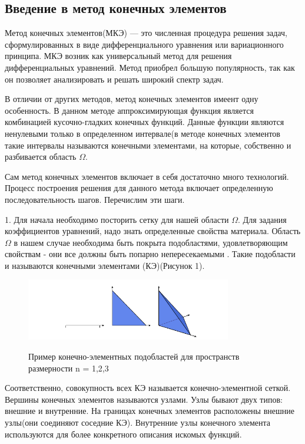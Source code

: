 \subsection{Введение в метод конечных элементов}

Метод конечных элементов(МКЭ) — это численная процедура решения задач,
сформулированных в виде дифференциального уравнения или вариационного 
принципа.\cite{bib:leibezon}
МКЭ возник как универсальный метод для решения дифференциальных уравнений. 
Метод приобрел большую популярность, так как он позволяет анализировать и
решать широкий спектр задач.


В отличии от других методов, метод конечных элементов имеент одну особенность.
В данном методе аппроксимирующая функция является комбинацией кусочно-гладких конечных функций.
Данные функции являются ненулевыми только в определенном интервале(в методе конечных элементов такие интервалы
называются конечными элементами, на которые, собственно и разбивается область $\Omega$.

Сам метод конечных элементов включает в себя достаточно много технологий. 
Процесс построения решения для данного метода включает
определенную последовательность шагов. Перечислим эти шаги.

1. Для начала необходимо посторить сетку для нашей области $\Omega$.
Для задания коэффициентов уравнений, надо знать определенные свойства материала.
Область $\Omega$ в нашем случае необходима быть покрыта подобластями, удовлетворяющим свойствам - 
они все должны быть попарно непересекаемыми \cite{bib:thomas}. Такие подобласти и называются конечными элементами (КЭ)(Рисунок 1).

\renewcommand{\figurename}{Рисунок}
\begin{figure}[H]
      \centering
      \includegraphics[width=0.8\textwidth]{./pics/random-cells.png}\\
      \centering\caption{Пример конечно-элементных подобластей для пространств размерности n = 1,2,3}
\end{figure}
Соответственно, совокупность всех КЭ называется конечно-элементной сеткой\cite{bib:logg}.
Вершины конечных элементов называются узлами. Узлы бывают двух типов: внешние и внутренние.
На границах конечных элементов расположены внешние узлы(они соединяют соседние КЭ).
Внутренние узлы конечного элемента используются для более конкретного описания искомых функций\cite{bib:thomas}.

